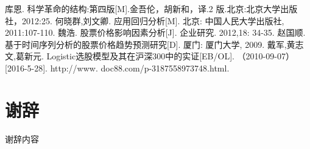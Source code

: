 \documentclass[UTF8,10.5pt,a4paper]{ctexart}
\numberwithin{equation}{section}
\theoremstyle{definition}
\theoremstyle{definition}
\begin{document}
\begin{thebibliography}{MM}
\begin{small}
  库恩. 科学革命的结构:第四版[M].金吾伦，胡新和，译.2 版.北京:北京大学出版社，2012:25.
何晓群,刘文卿. 应用回归分析[M]. 北京: 中国人民大学出版社,   2011:107-110.
魏浩.  股票价格影响因素分析[J].  企业研究. 2012,18: 34-35.
赵国顺.  基于时间序列分析的股票价格趋势预测研究[D]. 厦门: 厦门大学, 2009. 
 戴军,黄志文,葛新元.  Logistic选股模型及其在沪深300中的实证[EB/OL]. （2010-09-07）[2016-5-28].  http://www. doc88.com/p-3187558973748.html. 



\end{small}
\end{thebibliography}
\newpage
\section*{谢\quad 辞}
谢辞内容
\end{document}
